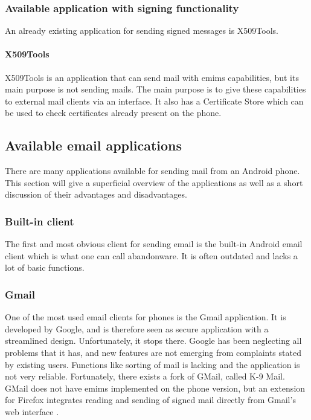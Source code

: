 \newpage

\subsubsection{Available application with signing functionality}
An already existing application for sending signed messages is X509Tools.

\paragraph{X509Tools} \hfill
\newline
X509Tools is an application that can send mail with \gls{emims} capabilities, but its main purpose is not sending mails. The main purpose is to give these capabilities to external mail clients via an interface. It also has a Certificate Store which can be used to check certificates already present on the phone. 

\subsection{Available email applications}
There are many applications available for sending mail from an Android phone. This section will give a superficial overview of the applications as well as a short discussion of their advantages and disadvantages.

\subsubsection{Built-in client}
The first and most obvious client for sending email is the built-in Android email client which is what one can call abandonware. It is often outdated and lacks a lot of basic functions.

\subsubsection{Gmail}
One of the most used email clients for phones is the Gmail application. It is developed by Google, and is therefore seen as secure application with a streamlined design. Unfortunately, it stops there. Google has been neglecting all problems that it has, and new features are not emerging from complaints stated by existing users. Functions like sorting of mail is lacking and the application is not very reliable. Fortunately, there exists a fork of GMail, called K-9 Mail. GMail does not have \gls{emims} implemented on the phone version, but an extension for Firefox integrates reading and sending of signed mail directly from Gmail's web interface \cite{bib:gmail}.

